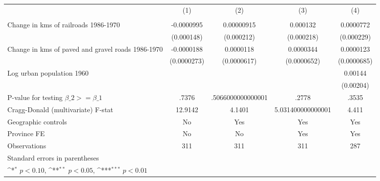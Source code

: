 {
\def\sym#1{\ifmmode^{#1}\else\(^{#1}\)\fi}
\begin{tabular}{l*{4}{c}}
\hline\hline
                &\multicolumn{1}{c}{(1)}&\multicolumn{1}{c}{(2)}&\multicolumn{1}{c}{(3)}&\multicolumn{1}{c}{(4)}\\
                &\multicolumn{1}{c}{}&\multicolumn{1}{c}{}&\multicolumn{1}{c}{}&\multicolumn{1}{c}{}\\
\hline
Change in kms of railroads 1986-1970&-0.0000995         &0.00000915         & 0.000132         &0.0000772         \\
                &(0.000148)         &(0.000212)         &(0.000218)         &(0.000229)         \\
[1em]
Change in kms of paved and gravel roads 1986-1970&-0.0000188         &0.0000118         &0.0000344         &0.0000123         \\
                &(0.0000273)         &(0.0000617)         &(0.0000652)         &(0.0000685)         \\
[1em]
Log urban population 1960&                  &                  &                  &  0.00144         \\
                &                  &                  &                  &(0.00204)         \\
\hline
P-value for testing $\beta\_{2} >= \beta\_{1}$&    .7376         &.5066000000000001         &    .2778         &    .3535         \\
Cragg-Donald (multivariate) F-stat&  12.9142         &   4.1401         &5.031400000000001         &    4.411         \\
Geographic controls&       No         &      Yes         &      Yes         &      Yes         \\
Province FE     &       No         &       No         &      Yes         &      Yes         \\
Observations    &      311         &      311         &      311         &      287         \\
\hline\hline
\multicolumn{5}{l}{\footnotesize Standard errors in parentheses}\\
\multicolumn{5}{l}{\footnotesize \sym{*} \(p<0.10\), \sym{**} \(p<0.05\), \sym{***} \(p<0.01\)}\\
\end{tabular}
}
